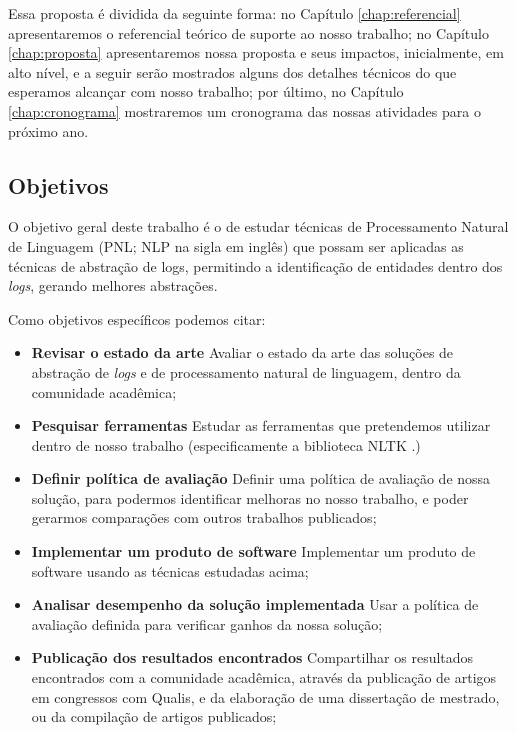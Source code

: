 \documentclass[
	12pt,				%
	openright,			%
	twoside,			%
	a4paper,			%
	english,			%
	french,				%
	spanish,			%
	brazil,				%
	]{abntex2}
\begin{document}
Essa proposta é dividida da seguinte forma: no Capítulo \ref{chap:referencial} apresentaremos o referencial teórico de suporte ao nosso trabalho; no Capítulo \ref{chap:proposta} apresentaremos nossa proposta e seus impactos, inicialmente, em alto nível, e a seguir serão mostrados alguns dos detalhes técnicos do que esperamos alcançar com nosso trabalho; por último, no Capítulo \ref{chap:cronograma} mostraremos um cronograma das nossas atividades para o próximo ano.

\subsection{Objetivos}

O objetivo geral deste trabalho é o de estudar técnicas de Processamento Natural de Linguagem (PNL; NLP na sigla em inglês) que possam ser aplicadas as técnicas de abstração de logs, permitindo a identificação de entidades dentro dos \emph{logs}, gerando melhores abstrações.

Como objetivos específicos podemos citar:
\begin{itemize}
	\item{\textbf{Revisar o estado da arte}} Avaliar o estado da arte das soluções de abstração de \emph{logs} e de processamento natural de linguagem, dentro da comunidade acadêmica;

	\item{\textbf{Pesquisar ferramentas}} Estudar as ferramentas que pretendemos utilizar dentro de nosso trabalho (especificamente a biblioteca NLTK \cite{bird2009natural}.)
	
	\item{\textbf{Definir política de avaliação}} Definir uma política de avaliação de nossa solução, para podermos identificar melhoras no nosso trabalho, e poder gerarmos comparações com outros trabalhos publicados;
	
	\item{\textbf{Implementar um produto de software}} Implementar um produto de software usando as técnicas estudadas acima;
	
	\item{\textbf{Analisar desempenho da solução implementada}} Usar a política de avaliação definida para verificar ganhos da nossa solução;
	
	\item{\textbf{Publicação dos resultados encontrados}} Compartilhar os resultados encontrados com a comunidade acadêmica, através da publicação de artigos em congressos com Qualis, e  da elaboração de uma dissertação de mestrado, ou da compilação de artigos publicados;
	
\end{itemize}
\end{document}
